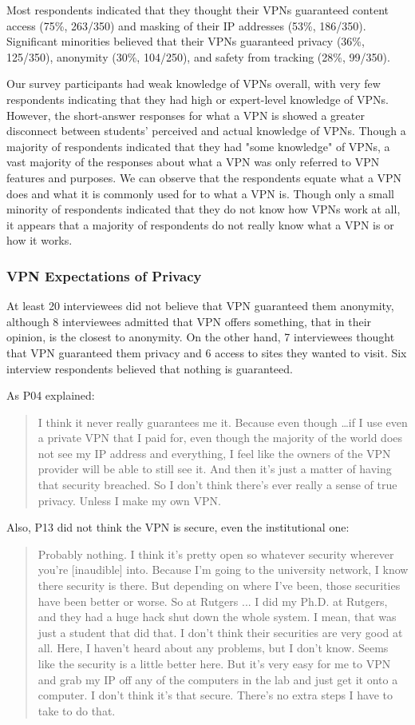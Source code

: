 Most respondents indicated that they thought their VPNs guaranteed content access (75\%, 263/350) and masking of their IP addresses (53\%, 186/350). Significant minorities believed that their VPNs guaranteed privacy (36\%, 125/350), anonymity (30\%, 104/250), and safety from tracking (28\%, 99/350).

Our survey participants had weak knowledge of VPNs overall, with very few respondents indicating that they had high or expert-level knowledge of VPNs. However, the short-answer responses for what a VPN is showed a greater disconnect between students’ perceived and actual knowledge of VPNs. Though a majority of respondents indicated that they had "some knowledge" of VPNs, a vast majority of the responses about what a VPN was only referred to VPN features and purposes. We can observe that the respondents equate what a VPN does and what it is commonly used for to what a VPN is. Though only a small minority of respondents indicated that they do not know how VPNs work at all, it appears that a majority of respondents do not really know what a VPN is or how it works.


\subsubsection{VPN Expectations of Privacy}
At least 20 interviewees did not believe that VPN guaranteed them anonymity, although 8 interviewees admitted that VPN offers something, that in their opinion, is the closest to anonymity. On the other hand, 7 interviewees thought that VPN guaranteed them privacy and 6 access to sites they wanted to visit. Six interview respondents believed that nothing is guaranteed.

As P04 explained:
\begin{quote}I think it never really guarantees me it. Because even though \dots if I use even a private VPN that I paid for, even though the majority of the world does not see my IP address and everything, I feel like the owners of the VPN provider will be able to still see it. And then it's just a matter of having that security breached. So I don't think there's ever really a sense of true privacy. Unless I make my own VPN.\end{quote}


Also, P13 did not think the VPN is secure, even the institutional one:
\begin{quote}Probably nothing. I think it's pretty open so whatever security wherever you're [inaudible] into. Because I'm going to the university network, I know there security is there. But depending on where I've been, those securities have been better or worse. So at Rutgers ... I did my Ph.D. at Rutgers, and they had a huge hack shut down the whole system. I mean, that was just a student that did that. I don't think their securities are very good at all. Here, I haven't heard about any problems, but I don't know. Seems like the security is a little better here. But it's very easy for me to VPN and grab my IP off any of the computers in the lab and just get it onto a computer. I don't think it's that secure. There's no extra steps I have to take to do that.\end{quote}


